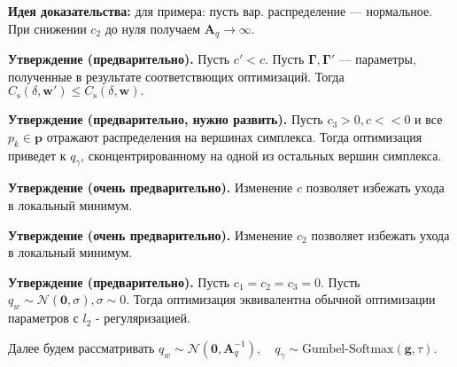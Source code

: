 \documentclass[12pt]{article}
\begin{document}
\textbf{Идея доказательства:}  для примера: пусть вар. распределение --- нормальное. При снижении $c_2$ до нуля получаем $\mathbf{A}_q \to \infty$.

\textbf{Утверждение (предварительно).} Пусть $c' < c$. Пусть $ \boldsymbol{\Gamma},  \boldsymbol{\Gamma}'$ --- параметры, полученные в результате соответствющих оптимизаций. Тогда  $C_\text{s}(\delta, \mathbf{w}') \leq C_\text{s}(\delta, \mathbf{w}).$ 

\textbf{Утверждение (предварительно, нужно развить).} Пусть $c_3 > 0, c << 0$ и все $p_k \in \mathbf{p}$ отражают распределения на вершинах симплекса. Тогда оптимизация приведет к $q_\gamma$, сконцентрированному на одной из остальных вершин симплекса.

\textbf{Утверждение (очень предварительно).} Изменение $c$ позволяет избежать ухода в локальный минимум. 

\textbf{Утверждение (очень предварительно).} Изменение $c_2$ позволяет избежать ухода в локальный минимум.

\textbf{Утверждение (предварительно).} Пусть $c_1 = c_2 = c_3 = 0$. Пусть $q_w \sim \mathcal{N}(\mathbf{0}, \sigma), \sigma \sim 0$. 
Тогда оптимизация эквивалентна обычной оптимизации параметров с $l_2$ - регуляризацией.

Далее будем рассматривать $q_w \sim \mathcal{N}(\mathbf{0}, \mathbf{A}_q^{-1}), \quad q_\gamma \sim \text{Gumbel-Softmax}(\mathbf{g}, \tau).$
\end{document}
